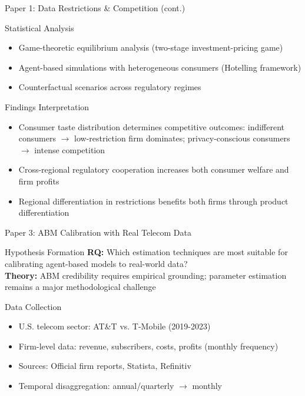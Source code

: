 \documentclass[10pt,aspectratio=169]{beamer}
\begin{document}
\begin{frame}{Paper 1: Data Restrictions \& Competition (cont.)}
  \begin{block}{Statistical Analysis}
    \begin{itemize}
      \item Game-theoretic equilibrium analysis (two-stage investment-pricing game)
      \item Agent-based simulations with heterogeneous consumers (Hotelling framework)
      \item Counterfactual scenarios across regulatory regimes
    \end{itemize}
  \end{block}

  \begin{alertblock}{Findings Interpretation}
    \begin{itemize}
      \item Consumer taste distribution determines competitive outcomes: indifferent consumers $\rightarrow$ low-restriction firm dominates; privacy-conscious consumers $\rightarrow$ intense competition
      \item Cross-regional regulatory cooperation increases both consumer welfare and firm profits
      \item Regional differentiation in restrictions benefits both firms through product differentiation
    \end{itemize}
  \end{alertblock}
\end{frame}

\begin{frame}{Paper 3: ABM Calibration with Real Telecom Data}
  \begin{block}{Hypothesis Formation}
    \textbf{RQ:} Which estimation techniques are most suitable for calibrating agent-based models to real-world data?
    \\
    \textbf{Theory:} ABM credibility requires empirical grounding; parameter estimation remains a major methodological challenge
  \end{block}

  \begin{block}{Data Collection}
    \begin{itemize}
      \item U.S. telecom sector: AT\&T vs. T-Mobile (2019-2023)
      \item Firm-level data: revenue, subscribers, costs, profits (monthly frequency)
      \item Sources: Official firm reports, Statista, Refinitiv
      \item Temporal disaggregation: annual/quarterly $\rightarrow$ monthly
    \end{itemize}
  \end{block}
\end{frame}
\end{document}
